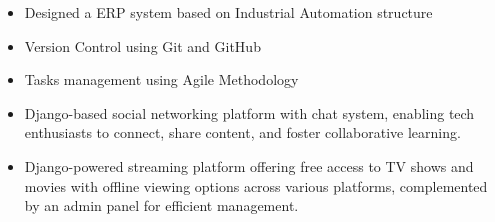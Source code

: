 \documentclass[10pt,a4paper,ragged2e,withhyper]{altacv}
\begin{document}
\begin{paracol}{2}



\begin{itemize}

\item Designed a ERP system based on Industrial Automation structure
\item Version Control using Git and GitHub
\item Tasks management using Agile Methodology


\end{itemize}



\begin{itemize}
\item Django-based social networking platform with chat system, enabling tech enthusiasts to connect, share content, and foster collaborative learning.

\end{itemize}

\divider


\begin{itemize}
\item Django-powered streaming platform offering free access to TV shows and movies with offline viewing options across various platforms, complemented by an admin panel for efficient management.

\end{itemize}






\end{paracol}
\end{document}
